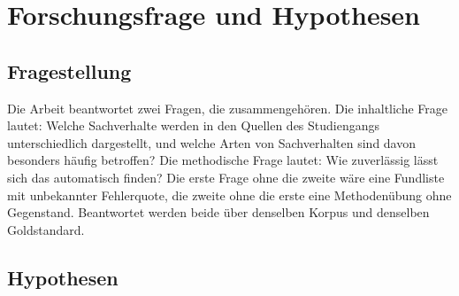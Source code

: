 
\section{Forschungsfrage und Hypothesen}
\label{sec:frage}

\subsection{Fragestellung}

Die Arbeit beantwortet zwei Fragen, die zusammengehören. Die inhaltliche Frage lautet:
Welche Sachverhalte werden in den Quellen des Studiengangs unterschiedlich dargestellt, und
welche Arten von Sachverhalten sind davon besonders häufig betroffen? Die methodische Frage
lautet: Wie zuverlässig lässt sich das automatisch finden? Die erste Frage ohne die zweite
wäre eine Fundliste mit unbekannter Fehlerquote, die zweite ohne die erste eine Methodenübung
ohne Gegenstand. Beantwortet werden beide über denselben Korpus und denselben Goldstandard.

\subsection{Hypothesen}

